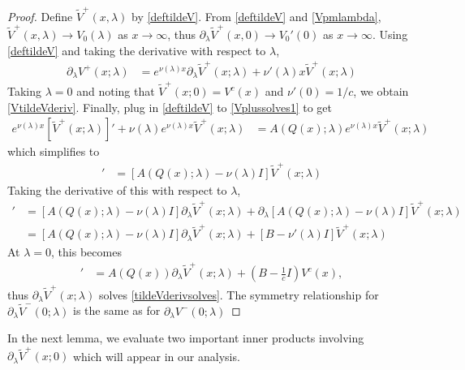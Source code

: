 \documentclass[thesis.tex]{subfiles}
\begin{document}
\begin{lemma}
\begin{proof}
Define $\tilde{V}^+(x, \lambda)$ by \cref{deftildeV}. From \cref{deftildeV} and \cref{Vpmlambda}, $\tilde{V}^+(x, \lambda) \rightarrow V_0(\lambda)$ as $x \rightarrow \infty$, thus $\partial_\lambda \tilde{V}^+(x, 0) \rightarrow V_0'(0)$ as $x \rightarrow \infty$. Using \cref{deftildeV} and taking the derivative with respect to $\lambda$,
\begin{align*}
\partial_\lambda V^+(x; \lambda)
&= e^{\nu(\lambda)x} \partial_\lambda \tilde{V}^+(x; \lambda) + \nu'(\lambda)x \tilde{V}^+(x; \lambda)
\end{align*}
Taking $\lambda = 0$ and noting that $\tilde{V}^+(x; 0) = V^c(x)$ and $\nu'(0) = 1/c$, we obtain \cref{VtildeVderiv}. Finally, plug in \cref{deftildeV} to \cref{Vplussolves1} to get
\begin{align*}
e^{\nu(\lambda)x} [\tilde{V}^+(x; \lambda)]' + \nu(\lambda) e^{\nu(\lambda)x} \tilde{V}^+(x; \lambda) &= 
A(Q(x); \lambda) e^{\nu(\lambda)x} \tilde{V}^+(x; \lambda)
\end{align*}
which simplifies to
\begin{align*}
[\tilde{V}^+(x; \lambda)]' &= 
[A(Q(x); \lambda) - \nu(\lambda) I ] \tilde{V}^+(x; \lambda)
\end{align*}
Taking the derivative of this with respect to $\lambda$,
\begin{align*}
[\partial_\lambda \tilde{V}^+(x; \lambda)]' &= 
[A(Q(x); \lambda) - \nu(\lambda) I ] \partial_\lambda \tilde{V}^+(x; \lambda) + \partial_\lambda [A(Q(x); \lambda) - \nu(\lambda) I ]\tilde{V}^+(x; \lambda) \\
&= [A(Q(x); \lambda) - \nu(\lambda) I ] \partial_\lambda \tilde{V}^+(x; \lambda) + [B - \nu'(\lambda)I]\tilde{V}^+(x; \lambda) 
\end{align*}
At $\lambda = 0$, this becomes
\begin{align*}
[\partial_\lambda \tilde{V}^+(0; \lambda)]' &= A(Q(x))\partial_\lambda \tilde{V}^+(x; \lambda) + \left( B - \frac{1}{c}I\right) V^c(x),
\end{align*}
thus $\partial_\lambda \tilde{V}^+(x; \lambda)$ solves \cref{tildeVderivsolves}. The symmetry relationship for $\partial_\lambda \tilde{V}^-(0; \lambda)$ is the same as for $\partial_\lambda V^-(0; \lambda)$
\end{proof}
\end{lemma}

In the next lemma, we evaluate two important inner products involving $\partial_\lambda \tilde{V}^+(x; 0)$ which will appear in our analysis.
\end{document}
